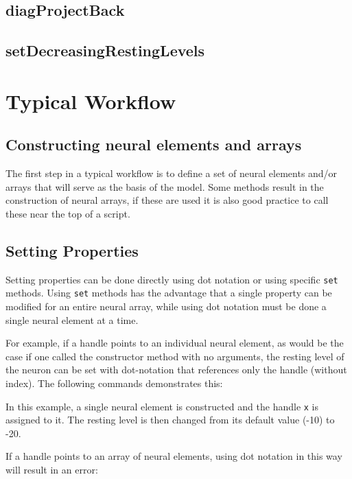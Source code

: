 \documentclass[phd, 12pt, doublespace, online]{fauthesis}
\begin{document}
\subsection{diagProjectBack}
\subsection{setDecreasingRestingLevels}

\section{Typical Workflow}

\subsection{Constructing neural elements and arrays}

The first step in a typical workflow is to define a set of neural elements and/or arrays that will serve as the basis of the model. Some methods result in the construction of neural arrays, if these are used it is also good practice to call these near the top of a script. 

\subsection{Setting Properties}
Setting properties can be done directly using dot notation or using specific {\tt set} methods. Using {\tt set} methods has the advantage that a single property can be modified for an entire neural array, while using dot notation must be done a single neural element at a time. 

For example, if a handle points to an individual neural element, as would be the case if one called the constructor method with no arguments, the resting level of the neuron can be set with dot-notation that references only the handle (without index). The following commands demonstrates this:


\bigskip
{}


\bigskip
\noindent In this example, a single neural element is constructed and the handle {\tt x} is assigned to it. The resting level is then changed from its default value (-10) to -20. 

If a handle points to an array of neural elements, using dot notation in this way will result in an error:

\bigskip
{}
\end{document}
